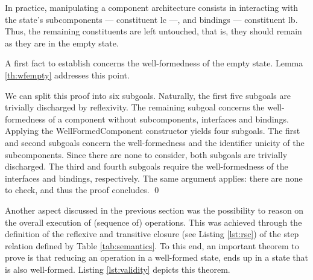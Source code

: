 	
	\noindent In practice, manipulating a \textsf{component} architecture consists in
	interacting with the \textsf{state}'s sub\textsf{component}s --- constituent \textsf{lc} ---, and bindings   
	--- constituent \textsf{lb}. Thus, the remaining constituents are left untouched, that is, they should remain
	as they are in the empty \textsf{state}.
	
		A first fact to establish concerns the well-formedness of the empty \textsf{state}. Lemma \ref{th:wfempty}
	addresses this	point.


	\begin{lemma} \label{th:wfempty}
				
			
		We can split this proof into six subgoals. Naturally, the first five subgoals are trivially discharged by reflexivity.		
	The remaining subgoal concerns the well-formedness of a \textsf{component} without sub\textsf{component}s,
	\textsf{interface}s and \textsf{binding}s. Applying the \textsf{WellFormedComponent} constructor yields
	four subgoals. The first and second subgoals concern the well-formedness and the \textsf{identifier} unicity 
	of the sub\textsf{component}s. Since there are none to consider, both subgoals are trivially discharged.
	The third and fourth subgoals require the well-formedness of the \textsf{interface}s and \textsf{binding}s, 
	respectively. The same argument applies: there are none to check, and thus the proof concludes. \qed
	\end{lemma}	

	 
	
	Another aspect discussed in the previous section was the possibility to reason on the
	overall execution of (sequence of) \textsf{operation}s. This was achieved through the definition
	of the reflexive and transitive closure (see Listing \ref{lst:rsc}) of the \textsf{step} relation 
	defined by Table \ref{tab:semantics}. To this end, an important theorem to prove is 
	that reducing an \textsf{operation} in a well-formed \textsf{state}, 
	ends up in a \textsf{state} that is also well-formed.
	Listing \ref{lst:validity} depicts this theorem.
	
				
	
	
